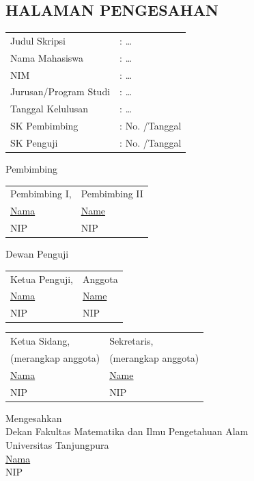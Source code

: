 \begin{singlespace}
\chapter*{HALAMAN PENGESAHAN}
\thispagestyle{empty}
\noindent
\begin{tabular}{@{}ll}
Judul Skripsi & : \dots \\
Nama Mahasiswa & : \dots \\
NIM & : \dots \\
Jurusan/Program Studi & : \dots \\
Tanggal Kelulusan & : \dots \\
SK Pembimbing & : No. \hspace{3cm} /Tanggal \\
SK Penguji & : No. \hspace{3cm} /Tanggal \\
\end{tabular}

\vspace{0.8cm}
\begin{center} Pembimbing \end{center}
\noindent
\begin{tabular}{@{}p{}p{}@{}}
\centering Pembimbing I, & \centering Pembimbing II \tabularnewline[1.2cm]
\centering \underline{Nama} & \centering \underline{Name} \tabularnewline
\centering NIP & \centering NIP \tabularnewline
\end{tabular}

\vspace{0.8cm}
\begin{center} Dewan Penguji \end{center}
\noindent
\begin{tabular}{@{}p{}p{}@{}}
\centering Ketua Penguji, & \centering Anggota \tabularnewline[1.2cm]
\centering \underline{Nama} & \centering \underline{Name} \tabularnewline
\centering NIP & \centering NIP \tabularnewline
\end{tabular}

\vspace{0.8cm}
\noindent
\begin{tabular}{@{}p{}p{}@{}}
\centering Ketua Sidang, & \centering Sekretaris, \tabularnewline
\centering (merangkap anggota) & \centering (merangkap anggota) \tabularnewline[1.2cm]
\centering \underline{Nama} & \centering \underline{Name} \tabularnewline
\centering NIP & \centering NIP \tabularnewline
\end{tabular}

\vspace{0.8cm}
\begin{center}
Mengesahkan \\
Dekan Fakultas Matematika dan Ilmu Pengetahuan Alam \\
Universitas Tanjungpura \\[1.5cm]
\underline{Nama} \\
NIP
\end{center}
\end{singlespace}
